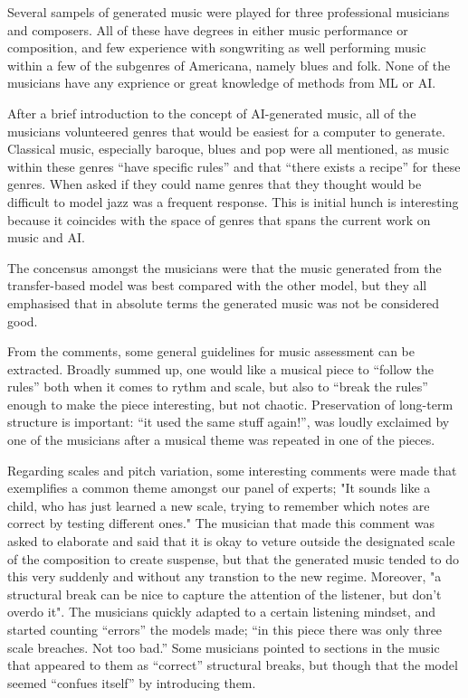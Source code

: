 \documentclass{IEEEtran}
\begin{document}
Several sampels of generated music were played for three
professional musicians and composers. All of these have degrees in
either music performance or composition, and few experience with 
songwriting as well performing music within a few of the subgenres of 
Americana, namely blues and folk. None of the musicians have any 
exprience or great knowledge of methods from ML or AI.

After a brief introduction to the concept of AI-generated music,
all of the musicians 
volunteered genres that would be easiest for a computer to generate. 
Classical music, especially baroque, blues and pop were all mentioned, 
as music within these genres ``have specific rules'' and that 
``there exists a recipe'' for these genres. When asked if they could
name genres that 
they thought would be difficult to model jazz was a frequent response.
This is initial hunch is interesting because 
it coincides with the space of genres that spans the current work on music 
and AI.

The concensus amongst the musicians were that the music generated from 
the transfer-based model was best compared with the other model, but they
all emphasised that in absolute terms the generated music was not be 
considered good.

From the comments, some general guidelines for music assessment can be 
extracted. Broadly summed up, one would like a musical piece to
``follow the rules'' both when it comes to rythm and scale, but also to 
``break the rules'' enough to make the piece interesting, but not 
chaotic. Preservation of long-term structure is important:
``it used the same stuff again!'', was loudly exclaimed 
by one of the musicians after a musical theme was repeated in one of the 
pieces.

Regarding scales and pitch variation, some interesting comments were 
made that exemplifies a common theme amongst our panel of experts;
"It sounds like a child, who has just learned a new scale, trying 
to remember which notes are correct by testing different ones." 
The musician that made this comment was asked to elaborate and 
said that it is okay to veture outside the designated scale of the 
composition to create suspense, but that the generated music tended 
to do this very suddenly and without any transtion to the new 
regime. Moreover, "a structural break
can be nice to capture the attention of the listener, but don't overdo
it". The musicians quickly adapted to a certain listening mindset, and
started counting ``errors'' the models made; ``in this piece there was 
only three scale breaches. Not too bad.'' Some musicians pointed to sections 
in the music that appeared to them as ``correct'' structural breaks, but 
though that the model seemed ``confues itself'' by introducing them.
\end{document}
